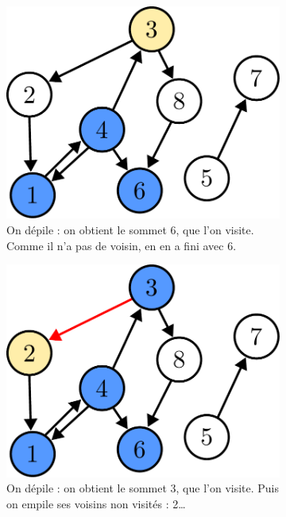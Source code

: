 \documentclass{article}
\begin{document}
\begin{itemize}
\begin{figure}[b]
		\begin{subfigure}[t]{0.3\linewidth}
			\centering
			\includegraphics[width=0.9\linewidth]{../figures/dfs2.pdf}
			\caption{On dépile : on obtient le sommet 6, que l'on visite. Comme il n'a pas de voisin, en en a fini avec 6.}
		\end{subfigure}\hfill%
		\begin{subfigure}[t]{0.3\linewidth}
			\centering
			\includegraphics[width=0.9\linewidth]{../figures/dfs3.pdf}
			\caption{On dépile : on obtient le sommet 3, que l'on visite. Puis on empile ses voisins non visités : 2\ldots}
		\end{subfigure}\hfill%
		\begin{subfigure}[t]{0.3\linewidth}
			\centering

\end{subfigure}
\end{figure}
\end{itemize}
\end{document}
